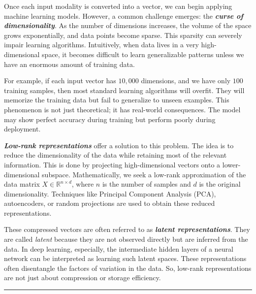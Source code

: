 Once each input modality is converted into a vector, we can begin applying machine learning models. However, a common challenge emerges: the \textit{\textbf{curse of dimensionality}}. As the number of dimensions increases, the volume of the space grows exponentially, and data points become sparse. This sparsity can severely impair learning algorithms. Intuitively, when data lives in a very high-dimensional space, it becomes difficult to learn generalizable patterns unless we have an enormous amount of training data.

For example, if each input vector has $10,000$ dimensions, and we have only $100$ training samples, then most standard learning algorithms will overfit. They will memorize the training data but fail to generalize to unseen examples. This phenomenon is not just theoretical; it has real-world consequences. The model may show perfect accuracy during training but perform poorly during deployment.

\textbf{\textit{Low-rank representations}} offer a solution to this problem. The idea is to reduce the dimensionality of the data while retaining most of the relevant information. This is done by projecting high-dimensional vectors onto a lower-dimensional subspace. Mathematically, we seek a low-rank approximation of the data matrix $X \in \mathbb{R}^{n \times d}$, where $n$ is the number of samples and $d$ is the original dimensionality. Techniques like Principal Component Analysis (PCA), autoencoders, or random projections are used to obtain these reduced representations.

These compressed vectors are often referred to as \textbf{\textit{latent representations}}. They are called \textit{latent} because they are not observed directly but are inferred from the data. In deep learning, especially, the intermediate hidden layers of a neural network can be interpreted as learning such latent spaces. These representations often disentangle the factors of variation in the data. So, low-rank representations are not just about compression or storage efficiency. 






\vspace{30pt}
\hrule

\afterpage{\blankpage}